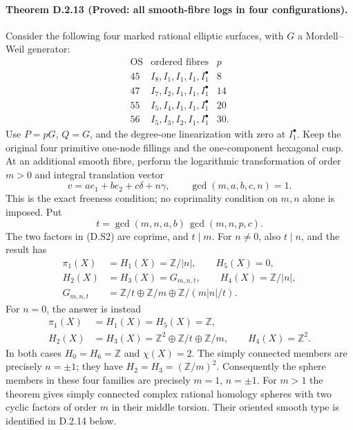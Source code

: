 \paragraph{Theorem D.2.13 (Proved: all smooth-fibre logs in four configurations).}
Consider the following four marked rational elliptic surfaces,
with $G$ a Mordell--Weil generator:
\[
\begin{array}{c|l|r}
\mathrm{OS}&\text{ordered fibres}&p\\\hline
45&I_8,I_1,I_1,I_1,I_1^\bullet&8\\
47&I_7,I_2,I_1,I_1,I_1^\bullet&14\\
55&I_5,I_4,I_1,I_1,I_1^\bullet&20\\
56&I_5,I_3,I_2,I_1,I_1^\bullet&30.
\end{array}
\]
Use $P=pG$, $Q=G$, and the degree-one linearization with zero
at $I_1^\bullet$. Keep the original four primitive one-node
fillings and the one-component hexagonal cusp. At an additional
smooth fibre, perform the logarithmic transformation of order
$m>0$ and integral translation vector
\[
 v=a e_1+b e_2+c\delta+n\gamma,\qquad
 \gcd(m,a,b,c,n)=1.
 \tag{D.S1}
\]
This is the exact freeness condition; no coprimality condition
on $m,n$ alone is imposed. Put
\[
 t=\gcd(m,n,a,b)\,\gcd(m,n,p,c).
 \tag{D.S2}
\]
The two factors in (D.S2) are coprime, and $t\mid m$.
For $n\ne0$, also $t\mid n$, and the result has
\[
\begin{aligned}
 \pi_1(X)&=H_1(X)=\mathbb Z/|n|,\qquad H_5(X)=0,\\
 H_2(X)&=H_3(X)=G_{m,n,t},\qquad H_4(X)=\mathbb Z/|n|,\\
 G_{m,n,t}&=\mathbb Z/t\oplus\mathbb Z/m
               \oplus\mathbb Z/(m|n|/t).
\end{aligned}
\tag{D.S3}
\]
For $n=0$, the answer is instead
\[
\begin{aligned}
 \pi_1(X)&=H_1(X)=H_5(X)=\mathbb Z,\\
 H_2(X)&=H_3(X)=\mathbb Z^2\oplus\mathbb Z/t\oplus\mathbb Z/m,
 \qquad H_4(X)=\mathbb Z^2.
\end{aligned}
\tag{D.S4}
\]
In both cases $H_0=H_6=\mathbb Z$ and $\chi(X)=2$.
The simply connected members are precisely $n=\pm1$; they
have $H_2=H_3=(\mathbb Z/m)^2$. Consequently the sphere
members in these four families are precisely $m=1$, $n=\pm1$.
For $m>1$ the theorem gives simply connected complex rational
homology spheres with two cyclic factors of order $m$ in their
middle torsion. Their oriented smooth type is identified in
D.2.14 below.
